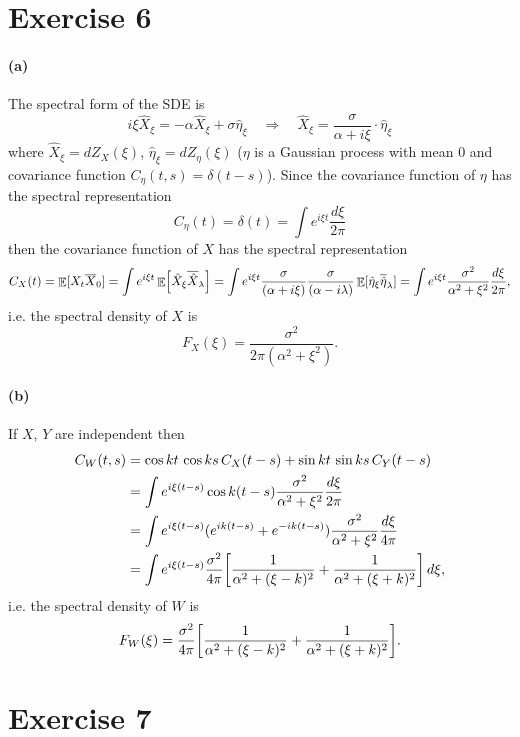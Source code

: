 \documentclass[a4paper,11pt]{article}
\theoremstyle{definition}
\theoremstyle{plain}
\theoremstyle{remark}
\DeclarePairedDelimiter{\parq}{[}{]}
\DeclareMathOperator*{\expval}{\mathbb{E}}
\begin{document}
\section*{Exercise 6}

\paragraph*{(a)}

The spectral form of the SDE is
$$
i\xi \hat{X}_\xi = -\alpha\hat{X}_\xi + \sigma\hat{\eta}_\xi \quad\Longrightarrow\quad \hat{X}_\xi = \frac{\sigma}{\alpha+i\xi}\cdot\hat{\eta}_\xi
$$
where $\hat{X}_\xi = dZ_X(\xi)$, $\hat{\eta}_\xi = dZ_\eta(\xi)$ ($\eta$ is a Gaussian process with mean $0$ and covariance function $C_\eta(t,s)=\delta(t-s)$).
Since the covariance function of $\eta$ has the spectral representation
$$
C_\eta(t) = \delta(t) = \int e^{i\xi t}\frac{d\xi}{2\pi}
$$
then the covariance function of $X$ has the spectral representation
$$
C_X(t) = \expval\parq{X_t\overline{X}_0} = \int e^{i\xi t}\expval\parq*{\hat{X}_\xi\overline{\hat{X}}_\lambda} = \int e^{i\xi t}\frac{\sigma}{(\alpha+i\xi)}\frac{\sigma}{(\alpha-i\lambda)}\expval[\hat{\eta}_\xi\overline{\hat{\eta}}_\lambda] = \int e^{i\xi t}\frac{\sigma^2}{\alpha^2+\xi^2}\frac{d\xi}{2\pi},
$$
i.e. the spectral density of $X$ is 
$$
F_X(\xi) = \frac{\sigma^2}{2\pi(\alpha^2+\xi^2)}.
$$

\paragraph*{(b)}

If $X$, $Y$ are independent then
\begin{align*}
C_{W}(t,s) & = \cos kt \, \cos ks \, C_X(t-s)  + \sin kt \, \sin ks \, C_Y(t-s) \\ & = \int e^{i\xi (t-s)}\cos k(t-s) \frac{\sigma^2}{\alpha^2+\xi^2}\frac{d\xi}{2\pi}
\\ & = \int e^{i\xi (t-s)}(e^{ik(t-s)}+e^{-ik(t-s)}) \frac{\sigma^2}{\alpha^2+\xi^2}\frac{d\xi}{4\pi} \\ & = \int e^{i\xi (t-s)} \frac{\sigma^2}{4\pi}\parq*{\frac{1}{\alpha^2+(\xi-k)^2}+\frac{1}{\alpha^2+(\xi+k)^2}}\,d\xi,
\end{align*}
i.e. the spectral density of $W$ is 
$$
F_W(\xi) = \frac{\sigma^2}{4\pi}\parq*{\frac{1}{\alpha^2+(\xi-k)^2}+\frac{1}{\alpha^2+(\xi+k)^2}}.
$$

\section*{Exercise 7}
\end{document}
